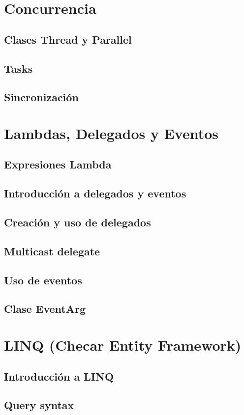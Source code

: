 \documentclass[12pt,a4paper]{report}
\begin{document}
\chapter{Concurrencia}
\section{Clases Thread y Parallel}
\section{Tasks}
\section{Sincronización}

\chapter{Lambdas, Delegados y Eventos}
\section{Expresiones Lambda}
\section{Introducción a delegados y eventos}
\section{Creación y uso de delegados}
\section{Multicast delegate}
\section{Uso de eventos}
\section{Clase EventArg}

\chapter{LINQ (Checar Entity Framework)}
\section{Introducción a LINQ}
\section{Query syntax}
\end{document}
